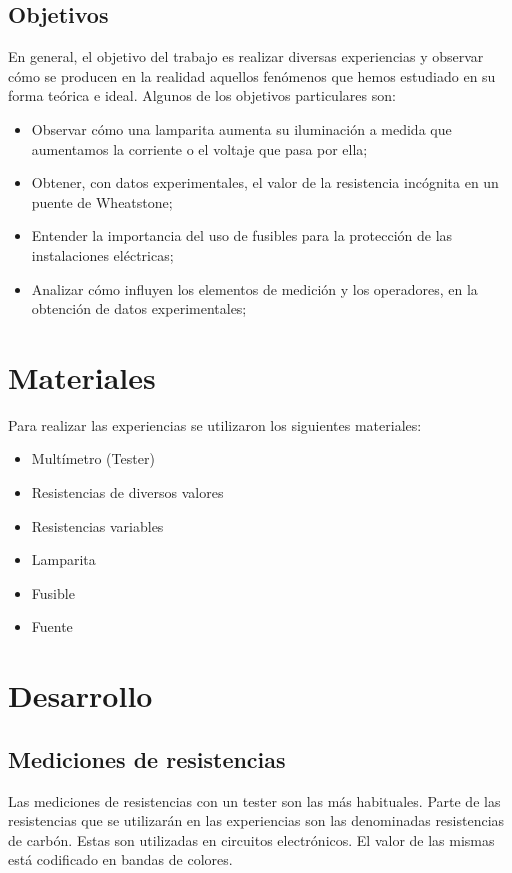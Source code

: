 \documentclass{article}
\begin{document}
\subsection{Objetivos}
En general, el objetivo del trabajo es realizar diversas experiencias y observar cómo se producen en la realidad aquellos fenómenos que hemos estudiado en su forma teórica e ideal. Algunos de los objetivos particulares son:
\begin{itemize}
	\item Observar cómo una lamparita aumenta su iluminación a medida que aumentamos la corriente o el voltaje que pasa por ella;
    \item Obtener, con datos experimentales, el valor de la resistencia incógnita en un puente de Wheatstone;
    \item Entender la importancia del uso de fusibles para la protección de las instalaciones eléctricas;
    \item Analizar cómo influyen los elementos de medición y los operadores, en la obtención de datos experimentales;
    
\end{itemize}

\section{Materiales}

Para realizar las experiencias se utilizaron los siguientes materiales:
\begin{itemize}
	\item Multímetro (Tester)
    \item Resistencias de diversos valores
    \item Resistencias variables
    \item Lamparita
    \item Fusible
    \item Fuente
\end{itemize}


\section{Desarrollo}

\subsection{Mediciones de resistencias}
Las mediciones de resistencias con un tester son las más habituales. 
Parte de las resistencias que se utilizarán en las experiencias son las 
denominadas resistencias de carbón. Estas son utilizadas en circuitos 
electrónicos. El valor de las mismas está codificado en bandas de 
colores.
\end{document}

